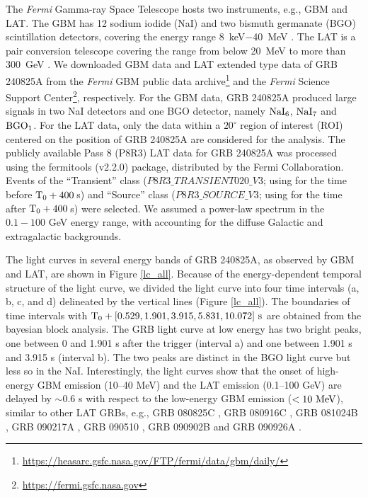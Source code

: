\documentclass[twocolumn]{aastex631}
\begin{document}
The {\em Fermi} Gamma-ray Space Telescope hosts two instruments, e.g., GBM and LAT. The GBM has 12 sodium iodide (NaI) and two bismuth germanate (BGO) scintillation detectors, covering the energy range 8~keV$-$40~MeV \citep{2009ApJ...702..791M}. The LAT is a pair conversion telescope covering the range from below 20~MeV to more than 300~GeV \citep{2009ApJ...697.1071A}.
We downloaded GBM data and LAT extended type data of GRB 240825A from the {\em Fermi} GBM public data archive\footnote{\url{https://heasarc.gsfc.nasa.gov/FTP/fermi/data/gbm/daily/}} and the {\em Fermi} Science Support Center\footnote{\url{https://fermi.gsfc.nasa.gov}}, respectively.
For the GBM data, GRB 240825A produced large signals in two NaI detectors and one BGO detector, namely $\rm NaI_6$, $\rm NaI_7$ and  $\rm BGO_1$. 
For the LAT data, only the data within a $20^\circ$ region of interest (ROI) centered on the position of GRB 240825A are considered for the analysis. The publicly available Pass 8 (P8R3) LAT data for GRB 240825A was processed using the fermitools (v2.2.0) package, distributed by the Fermi Collaboration. Events of the ``Transient'' class ($P8R3\_TRANSIENT020\_V3$; using for the time before $\rm T_0+400$\,s) and ``Source'' class ($P8R3\_SOURCE\_V3$; using for the time after $\rm T_0+400$\,s) were selected. We assumed a power-law spectrum in the $0.1-100$ GeV energy range, with accounting for the diffuse Galactic and extragalactic backgrounds. 


The light curves in several energy bands of GRB 240825A, as observed by GBM and LAT, are shown in Figure \ref{lc_all}. 
Because of the energy-dependent temporal structure of the light curve, we divided the light curve into four time intervals (a, b, c, and d) delineated by the vertical lines (Figure \ref{lc_all}). The boundaries of time intervals with $\rm T_0 +  [0.529, 1.901, 3.915, 5.831, 10.072]~s$ are obtained from the bayesian block analysis.
The GRB light curve at low energy has two bright peaks, one between 0 and 1.901 s after the trigger (interval a) and one between 1.901 s and 3.915 s (interval b). The two peaks are distinct in the BGO light curve but less so in the NaI.
Interestingly, the light curves show that the onset of high-energy GBM emission (10--40 MeV) and the LAT emission (0.1--100 GeV) are delayed by $\sim0.6$ s with respect to the low-energy GBM emission ($<10 \rm ~MeV$), similar to other LAT GRBs, e.g., 
GRB 080825C \citep{2009ApJ...707..580A},
GRB 080916C \citep{2009Sci...323.1688A},
GRB 081024B \citep{2010ApJ...712..558A},
GRB 090217A \citep{2010ApJ...717L.127A},
GRB 090510 \citep{2009Natur.462..331A,2010ApJ...716.1178A},
GRB 090902B \citep{2009ApJ...706L.138A} and 
GRB 090926A \citep{2011ApJ...729..114A}.
\end{document}
